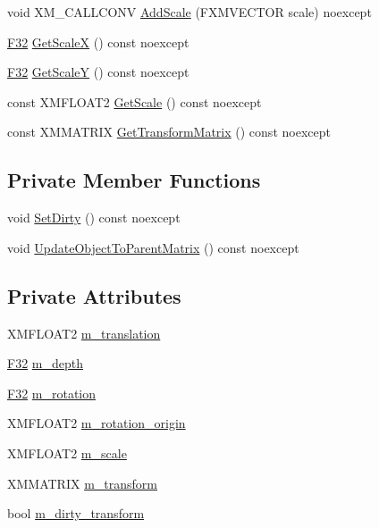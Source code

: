 \begin{DoxyCompactItemize}
\item 
void X\+M\+\_\+\+C\+A\+L\+L\+C\+O\+NV \hyperlink{structmage_1_1_sprite_transform_a9064eb670f25dbcd6937971b9ccaadda}{Add\+Scale} (F\+X\+M\+V\+E\+C\+T\+OR scale) noexcept
\item 
\hyperlink{namespacemage_aa97e833b45f06d60a0a9c4fc22ae02c0}{F32} \hyperlink{structmage_1_1_sprite_transform_af82246da3228dfc1588ca806ddf6315f}{Get\+ScaleX} () const noexcept
\item 
\hyperlink{namespacemage_aa97e833b45f06d60a0a9c4fc22ae02c0}{F32} \hyperlink{structmage_1_1_sprite_transform_a07010f5d7e781ca641456b18fd16e67f}{Get\+ScaleY} () const noexcept
\item 
const X\+M\+F\+L\+O\+A\+T2 \hyperlink{structmage_1_1_sprite_transform_ac62a9a5b40abbbb40398885010990e55}{Get\+Scale} () const noexcept
\item 
const X\+M\+M\+A\+T\+R\+IX \hyperlink{structmage_1_1_sprite_transform_a4e5d58a02d951c021e3e41e4ac183d0d}{Get\+Transform\+Matrix} () const noexcept
\end{DoxyCompactItemize}
\subsection*{Private Member Functions}
\begin{DoxyCompactItemize}
\item 
void \hyperlink{structmage_1_1_sprite_transform_ab76e0ca7d8f4e37a8a6f58a7a9face17}{Set\+Dirty} () const noexcept
\item 
void \hyperlink{structmage_1_1_sprite_transform_a92ae51f7dbf034d119625f70aa7fad1c}{Update\+Object\+To\+Parent\+Matrix} () const noexcept
\end{DoxyCompactItemize}
\subsection*{Private Attributes}
\begin{DoxyCompactItemize}
\item 
X\+M\+F\+L\+O\+A\+T2 \hyperlink{structmage_1_1_sprite_transform_a7642907ec8ae9685bb7c56675607045b}{m\+\_\+translation}
\item 
\hyperlink{namespacemage_aa97e833b45f06d60a0a9c4fc22ae02c0}{F32} \hyperlink{structmage_1_1_sprite_transform_a646e129b2e9702eec23b4c673f07dfef}{m\+\_\+depth}
\item 
\hyperlink{namespacemage_aa97e833b45f06d60a0a9c4fc22ae02c0}{F32} \hyperlink{structmage_1_1_sprite_transform_a7c705543e7f6a9c7e7a517ffef2cb4b9}{m\+\_\+rotation}
\item 
X\+M\+F\+L\+O\+A\+T2 \hyperlink{structmage_1_1_sprite_transform_ae51ebd0226ef4b569b6a66884823bd18}{m\+\_\+rotation\+\_\+origin}
\item 
X\+M\+F\+L\+O\+A\+T2 \hyperlink{structmage_1_1_sprite_transform_a7532d4d41d02b5fa6f31eeb4fd4fd886}{m\+\_\+scale}
\item 
X\+M\+M\+A\+T\+R\+IX \hyperlink{structmage_1_1_sprite_transform_ad2fec50a82772514da9399ff31703f3d}{m\+\_\+transform}
\item 
bool \hyperlink{structmage_1_1_sprite_transform_a3072ed606f16d14d16cdad46438e9cf3}{m\+\_\+dirty\+\_\+transform}
\end{DoxyCompactItemize}
